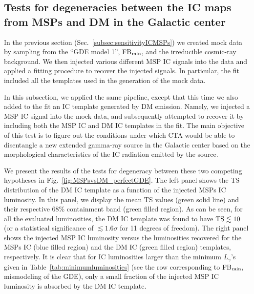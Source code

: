\documentclass[doublespace,nopageskip]{VTthesis}
\begin{document}
\subsection{Tests for degeneracies between the IC maps from MSPs and DM in the Galactic center}
\label{subsec:degeneracyDMvsMSPs}

In the previous section (Sec.~\ref{subsec:sensitivityICMSPs}) we created mock data by sampling from the  ``GDE model 1'', FB$_{\rm min}$, and the irreducible cosmic-ray background. We then injected various different MSP IC signals into the data and applied a fitting procedure to recover the injected signals. In particular, the fit included all the templates used in the generation of the mock data. 

In this subsection, we applied the same pipeline, except that this time we also added to the fit an IC template generated by DM emission. Namely, we injected a MSP IC signal into the mock data, and subsequently attempted to recover it by including both the MSP IC and DM IC templates in the fit. The main objective of this test is to figure out the conditions under which CTA would be able to disentangle a new extended gamma-ray source in the Galactic center based on the morphological characteristics of the IC radiation emitted by the source.

We present the results of the tests for degeneracy between these two competing hypotheses in Fig.~\ref{fig:MSPsvsDM_perfectGDE}. The left panel shows the TS distribution of the DM IC template as a function of the injected MSPs IC luminosity. In this panel, we display the mean TS values (green solid line) and their respective 68\% containment band (green filled region). As can be seen, for all the evaluated luminosities, the DM IC template was found to have ${\rm TS}\lesssim 10$ (or a statistical significance of $\lesssim 1.6\sigma$ for 11 degrees of freedom). The right panel shows the injected MSP IC luminosity versus the luminosities recovered for the MSPs IC (blue filled region) and the DM IC (green filled region) templates, respectively. It is clear that for IC luminosities larger than the minimum $L_{\gamma}$'s given in Table~\ref{tab:minimumluminosities} (see the row corresponding to FB$_{\rm min}$, mismodeling of the GDE), only a small fraction of the injected MSP IC luminosity is absorbed by the DM IC template.
\end{document}
